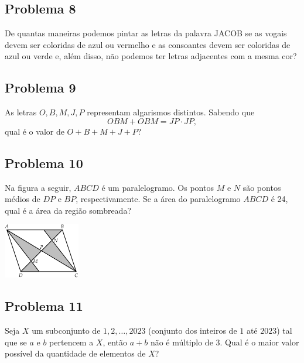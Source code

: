 \documentclass[12pt]{article}
\begin{document}
\clearpage

\subsection{Problema 8}
\begin{tcolorbox}[statementbox]
De quantas maneiras podemos pintar as letras da palavra JACOB se as vogais devem ser coloridas de azul ou vermelho e as
consoantes devem ser coloridas de azul ou verde e, além disso, não podemos ter letras adjacentes com a mesma cor?
\end{tcolorbox}

\clearpage

\subsection{Problema 9}
\begin{tcolorbox}[statementbox]
As letras \(O, B, M, J, P\) representam algarismos distintos. Sabendo que
\[
  OBM + OBM = JP \cdot JP,
\]
qual é o valor de \(O+B+M+J+P\)?
\end{tcolorbox}

\clearpage

\subsection{Problema 10}
\begin{tcolorbox}[statementbox]
Na figura a seguir, \(ABCD\) é um paralelogramo. Os pontos \(M\) e \(N\) são pontos médios de \(DP\) e \(BP\), respectivamente.
Se a área do paralelogramo \(ABCD\) é 24, qual é a área da região sombreada?
\begin{center}
  \includegraphics[width=0.25\textwidth]{second.png}
\end{center}
\end{tcolorbox}

\clearpage

\subsection{Problema 11}
\begin{tcolorbox}[statementbox]
  Seja $X$ um subconjunto de ${1, 2, \dots,2023}$ (conjunto dos inteiros de $1$ até $2023$) tal que se $a$ e $b$ pertencem a $X$, então $a + b$ 
  não é múltiplo de $3$. Qual é o maior valor possível da quantidade de elementos de \(X\)?
\end{tcolorbox}
\end{document}
